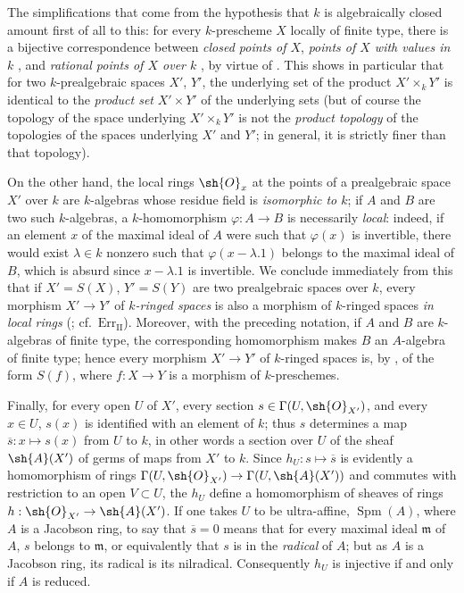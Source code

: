 \begin{env}[10.10.3]
\label{IV.10.10.3}
The simplifications that come from the hypothesis that $k$ is algebraically closed amount first of all to this: for every $k$-prescheme $X$ locally of finite type, there is a bijective correspondence between \emph{closed points of $X$}, \emph{points of $X$ with values in $k$} , and \emph{rational points of $X$ over $k$} , by virtue of .
This shows in particular  that for two $k$-prealgebraic spaces $X'$, $Y'$, the underlying set of the product $X'\times_kY'$ is identical to the \emph{product set} $X'\times Y'$ of the underlying sets (but of course the topology of the space underlying $X'\times_kY'$ is not the \emph{product topology} of the topologies of the spaces underlying $X'$ and $Y'$; in general, it is strictly finer than that topology).

On the other hand, the local rings $\sh{O}_x$ at the points of a prealgebraic space $X'$ over $k$ are $k$-algebras whose residue field is \emph{isomorphic to $k$}; if $A$ and $B$ are two such $k$-algebras, a $k$-homomorphism $\varphi:A\to B$ is necessarily \emph{local}: indeed, if an element $x$ of the maximal ideal of $A$ were such that $\varphi(x)$ is invertible, there would exist $\lambda\in k$ nonzero such that $\varphi(x-\lambda.1)$ belongs to the maximal ideal of $B$, which is absurd since $x-\lambda.1$ is invertible.
We conclude immediately from this that if $X'=S(X)$, $Y'=S(Y)$ are two prealgebraic spaces over $k$, every morphism $X'\to Y'$ of \emph{$k$-ringed spaces} is also a morphism of $k$-ringed spaces \emph{in local rings} (; cf.\ $\mathrm{Err}_{\mathrm{II}}$). Moreover, with the preceding notation, if $A$ and $B$ are $k$-algebras of finite type, the corresponding homomorphism makes $B$ an $A$-algebra of finite type; hence every morphism $X'\to Y'$ of $k$-ringed spaces is, by , of the form $S(f)$, where $f:X\to Y$ is a morphism of $k$-preschemes.

Finally, for every open $U$ of $X'$, every section $s\in\Gamma(U,\sh{O}_{X'})$, and every $x\in U$, $s(x)$  is identified with an element of $k$; thus $s$ determines a map $\overline{s}:x\mapsto s(x)$ from $U$ to $k$, in other words a section over $U$ of the sheaf $\sh{A}(X')$ of germs of maps from $X'$ to $k$. Since $h_U:s\mapsto\overline{s}$ is evidently a homomorphism of rings $\Gamma(U,\sh{O}_{X'})\to\Gamma(U,\sh{A}(X'))$ and commutes with restriction to an open $V\subset U$, the $h_U$ define a homomorphism of sheaves of rings $h:\sh{O}_{X'}\to\sh{A}(X')$.
If one takes $U$ to be ultra-affine, $\operatorname{Spm}(A)$, where $A$ is a Jacobson ring, to say that $\overline{s}=0$ means that for every maximal ideal $\mathfrak{m}$ of $A$, $s$ belongs to $\mathfrak{m}$, or equivalently that $s$ is in the \emph{radical} of $A$; but as $A$ is a Jacobson ring, its radical is its nilradical. Consequently $h_U$ is injective if and only if $A$ is reduced.
\end{env}

